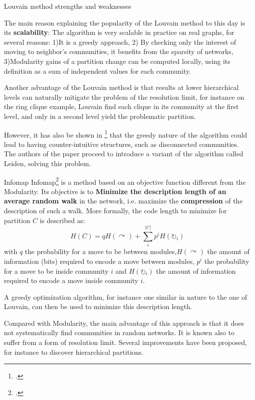\documentclass[a4paper,11pt]{book}
\begin{document}
\begin{textbox}{Louvain method strengths and weaknesses}

The main reason explaining the popularity of the Louvain method to this day is its
   \textbf{scalability}: The algorithm is very scalable in practice on real graphs, for several reasons: 1)It is a greedy approach, 2) By checking only the interest of moving to neighbor's communities, it benefits from the sparsity of networks, 3)Modularity gains of a partition change can be computed locally, using its definition as a sum of independent values for each community.

Another advantage of the Louvain method is that results at lower hierarchical levels can naturally mitigate the problem of the resolution limit, for instance on the ring clique example, Louvain find each clique in its community at the first level, and only  in a second level yield the problematic partition.

However, it has also be shown in \footcite{traag2019louvain} that the greedy nature of the algorithm could lead to having counter-intuitive structures, such as disconnected communities. The authors of  the paper proceed to introduce a variant of the algorithm called Leiden, solving this problem.
\end{textbox}





\begin{textbox}{Infomap}
Infomap\footcite{rosvall2008maps} is a method based on an objective function different from the Modularity. Its objective is to \textbf{Minimize the description length of an average random walk} in the network, i.e. maximize the \textbf{compression} of the description of such a walk. More formally, the code length to minimize for partition $C$ is described as:
\[
H(C)=qH(\curvearrowright)+\sum_i^{|C|}p^iH(\circlearrowright_i)
\]
with $q$ the probability for a move to be between modules,$H(\curvearrowright)$ the amount of information (bits) required to encode a move between modules, $p^i$ the probability for a move to be inside community $i$ and $H(\circlearrowright_i)$ the amount of information required to encode a move inside community $i$.

A greedy optimization algorithm, for instance one similar in nature to the one of Louvain, can then be used to minimize this description length.

Compared with Modularity, the main advantage of this approach is that it does not systematically find communities in random networks. It is known also to suffer from a form of resolution limit.
Several improvements have been proposed, for instance to discover hierarchical partitions.
\end{textbox}
\end{document}
